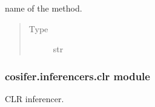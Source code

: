 \documentclass[letterpaper,10pt,english]{sphinxmanual}
\begin{document}
\begin{fulllineitems}
\begin{fulllineitems}
\label{\detokenize{_modules/cosifer.inferencers:cosifer.inferencers.aracne.Aracne.method}}
name of the method.
\begin{quote}\begin{description}
\item[{Type}] \leavevmode
str

\end{description}\end{quote}

\end{fulllineitems}


\end{fulllineitems}



\subsubsection{cosifer.inferencers.clr module}
\label{\detokenize{_modules/cosifer.inferencers:module-cosifer.inferencers.clr}}\label{\detokenize{_modules/cosifer.inferencers:cosifer-inferencers-clr-module}}
CLR inferencer.
\end{document}
